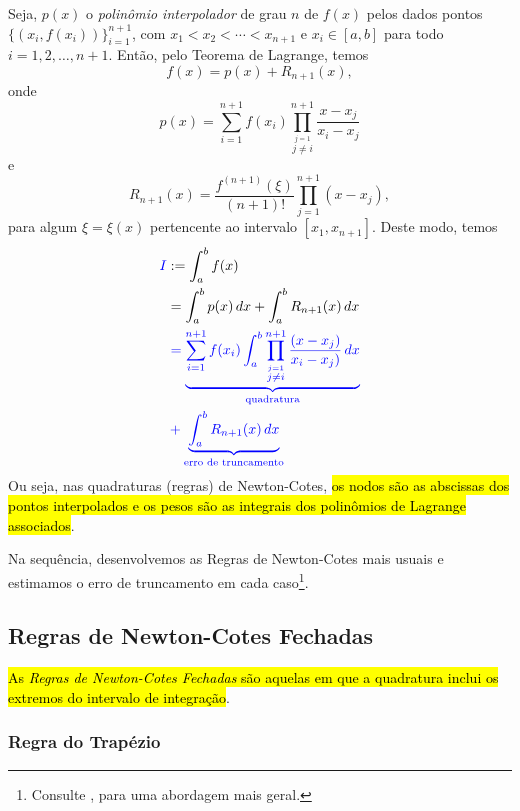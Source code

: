 Seja, $p(x)$ o \emph{polinômio interpolador} de grau $n$ de $f(x)$ pelos dados pontos $\{(x_i, f(x_i))\}_{i=1}^{n+1}$, com $x_1 < x_2 < \cdots < x_{n+1}$ e $x_i\in [a, b]$ para todo $i=1, 2, \dotsc, n+1$. Então, pelo Teorema de Lagrange, temos
\begin{equation}
  f(x) = p(x) + R_{n+1}(x),
\end{equation}
onde
\begin{equation}
  p(x) = \sum_{i=1}^{n+1} f(x_i)\prod_{\overset{j=1}{j\neq i}}^{n+1} \frac{x-x_j}{x_i-x_j}
\end{equation}
e
\begin{equation}
  R_{n+1}(x) = \frac{f^{(n+1)}(\xi)}{(n+1)!}\prod_{j=1}^{n+1}(x-x_j),
\end{equation}
para algum $\xi = \xi(x)$ pertencente ao intervalo $[x_1, x_{n+1}]$. Deste modo, temos
\begin{subequations}
  \begin{align}
    \color{blue}I &:= \int_a^b f(x)\\
      &= \int_a^b p(x)\,dx + \int_a^b R_{n+1}(x)\,dx\\
      &\color{blue}= \underbrace{\sum_{i=1}^{n+1} f(x_i)\int_a^b \prod_{\overset{j=1}{j\neq i}}^{n+1} \frac{(x-x_j)}{x_i-x_j)}\,dx}_{\text{quadratura}}\nonumber\\
      &\color{blue}+ \underbrace{\int_a^b R_{n+1}(x)\,dx}_{\text{erro de truncamento}}
\end{align}
\end{subequations}
Ou seja, nas quadraturas (regras) de Newton-Cotes, \hl{os nodos são as abscissas dos pontos interpolados e os pesos são as integrais dos polinômios de Lagrange associados}.

Na sequência, desenvolvemos as Regras de Newton-Cotes mais usuais e estimamos o erro de truncamento em cada caso\footnote{Consulte \cite[Cap. 7,Sec. 1.1]{Isaacson1994a}, para uma abordagem mais geral.}.

\subsection{Regras de Newton-Cotes Fechadas}

\hl{As \emph{Regras de Newton-Cotes Fechadas} são aquelas em que a quadratura inclui os extremos do intervalo de integração}.

\subsubsection{Regra do Trapézio}

